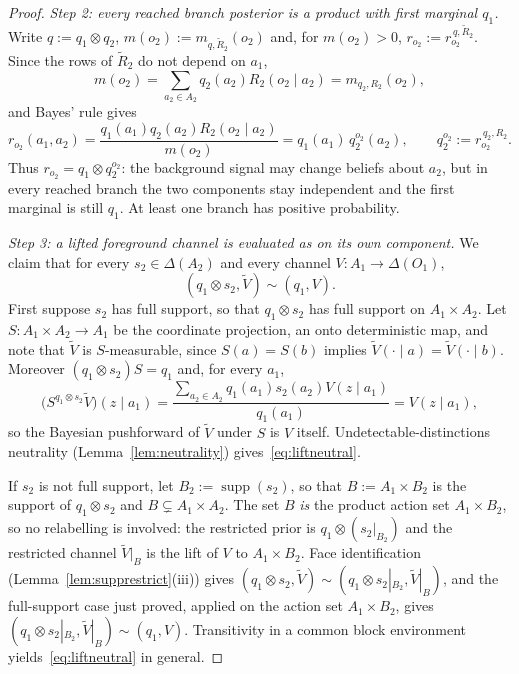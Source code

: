 \documentclass[11pt,a4paper]{article}
\theoremstyle{definition}
\newcommand{\1}{\mathbf 1}
\begin{document}
\begin{proof}
\emph{Step 2: every reached branch posterior is a product with first marginal $q_1$.}
Write $q:=q_1\otimes q_2$, $m(o_2):=m_{q,\widetilde R_2}(o_2)$ and, for $m(o_2)>0$, $r_{o_2}:=r_{o_2}^{\,q,\widetilde R_2}$.
Since the rows of $\widetilde R_2$ do not depend on $a_1$,
\[
m(o_2)=\sum_{a_2\in A_2}q_2(a_2)R_2(o_2\mid a_2)=m_{q_2,R_2}(o_2),
\]
and Bayes' rule gives
\[
r_{o_2}(a_1,a_2)
=\frac{q_1(a_1)q_2(a_2)R_2(o_2\mid a_2)}{m(o_2)}
=q_1(a_1)\,q_2^{o_2}(a_2),
\qquad
q_2^{o_2}:=r_{o_2}^{\,q_2,R_2}.
\]
Thus $r_{o_2}=q_1\otimes q_2^{o_2}$: the background signal may change beliefs about $a_2$, but in every reached branch
the two components stay independent and the first marginal is still $q_1$.  At least one branch has positive
probability.

\emph{Step 3: a lifted foreground channel is evaluated as on its own component.}
We claim that for every $s_2\in\Delta(A_2)$ and every channel $V:A_1\to\Delta(O_1)$,
\begin{equation}
(q_1\otimes s_2,\widetilde V)\sim(q_1,V).
\tag{$\dagger$}\label{eq:liftneutral}
\end{equation}
First suppose $s_2$ has full support, so that $q_1\otimes s_2$ has full support on $A_1\times A_2$.  Let
$S:A_1\times A_2\to A_1$ be the coordinate projection, an onto deterministic map, and note that $\widetilde V$ is
$S$-measurable, since $S(a)=S(b)$ implies $\widetilde V(\cdot\mid a)=\widetilde V(\cdot\mid b)$.  Moreover
$(q_1\otimes s_2)S=q_1$ and, for every $a_1$,
\[
\bigl(S^{q_1\otimes s_2}\widetilde V\bigr)(z\mid a_1)
=\frac{\sum_{a_2\in A_2}q_1(a_1)s_2(a_2)V(z\mid a_1)}{q_1(a_1)}
=V(z\mid a_1),
\]
so the Bayesian pushforward of $\widetilde V$ under $S$ is $V$ itself.  Undetectable-distinctions neutrality
(Lemma~\ref{lem:neutrality}) gives~\eqref{eq:liftneutral}.

If $s_2$ is not full support, let $B_2:=\operatorname{supp}(s_2)$, so that $B:=A_1\times B_2$ is the support of
$q_1\otimes s_2$ and $B\subsetneq A_1\times A_2$.  The set $B$ \emph{is} the product action set $A_1\times B_2$, so no
relabelling is involved: the restricted prior is
$q_1\otimes(s_2|_{B_2})$ and the restricted channel $\widetilde V|_B$ is the lift of $V$ to $A_1\times B_2$.  Face
identification (Lemma~\ref{lem:supprestrict}(iii)) gives
$(q_1\otimes s_2,\widetilde V)\sim(q_1\otimes s_2|_{B_2},\widetilde V|_B)$, and the full-support case just proved,
applied on the action set $A_1\times B_2$, gives $(q_1\otimes s_2|_{B_2},\widetilde V|_B)\sim(q_1,V)$.  Transitivity in a
common block environment yields~\eqref{eq:liftneutral} in general.


\end{proof}
\end{document}
